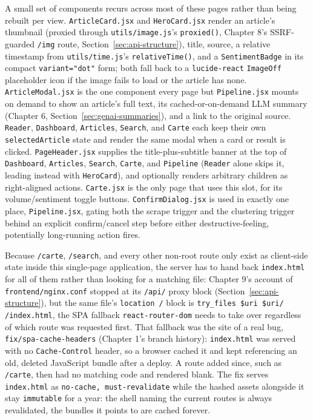 \begin{sloppypar}
A small set of components recurs across most of these pages rather than being rebuilt per view. \texttt{ArticleCard.jsx} and \texttt{HeroCard.jsx} render an article's thumbnail (proxied through \texttt{utils/\allowbreak image.js}'s \texttt{proxied()}, Chapter 8's SSRF-guarded \texttt{/img} route, Section~\ref{sec:api-structure}), title, source, a relative timestamp from \texttt{utils/\allowbreak time.js}'s \texttt{relativeTime()}, and a \texttt{SentimentBadge} in its compact \texttt{variant="dot"} form; both fall back to a \texttt{lucide-react} \texttt{ImageOff} placeholder icon if the image fails to load or the article has none. \texttt{ArticleModal.jsx} is the one component every page but \texttt{Pipeline.jsx} mounts on demand to show an article's full text, its cached-or-on-demand LLM summary (Chapter 6, Section~\ref{sec:genai-summaries}), and a link to the original source. \texttt{Reader}, \texttt{Dashboard}, \texttt{Articles}, \texttt{Search}, and \texttt{Carte} each keep their own \texttt{selectedArticle} state and render the same modal when a card or result is clicked. \texttt{PageHeader.jsx} supplies the title-plus-subtitle banner at the top of \texttt{Dashboard}, \texttt{Articles}, \texttt{Search}, \texttt{Carte}, and \texttt{Pipeline} (\texttt{Reader} alone skips it, leading instead with \texttt{HeroCard}), and optionally renders arbitrary children as right-aligned actions. \texttt{Carte.jsx} is the only page that uses this slot, for its volume/sentiment toggle buttons. \texttt{ConfirmDialog.jsx} is used in exactly one place, \texttt{Pipeline.jsx}, gating both the scrape trigger and the clustering trigger behind an explicit confirm/cancel step before either destructive-feeling, potentially long-running action fires.
\end{sloppypar}

\begin{sloppypar}
Because \texttt{/carte}, \texttt{/search}, and every other non-root route only exist as client-side state inside this single-page application, the server has to hand back \texttt{index.html} for all of them rather than looking for a matching file: Chapter 9's account of \texttt{frontend/\allowbreak nginx.conf} stopped at its \texttt{/api/} proxy block (Section~\ref{sec:api-structure}), but the same file's \texttt{location /} block is \texttt{try\_files \$uri \$uri/ /index.html}, the SPA fallback \texttt{react-router-dom} needs to take over regardless of which route was requested first. That fallback was the site of a real bug, \texttt{fix/\allowbreak spa-cache-headers} (Chapter 1's branch history): \texttt{index.html} was served with no \texttt{Cache-Control} header, so a browser cached it and kept referencing an old, deleted JavaScript bundle after a deploy. A route added since, such as \texttt{/carte}, then had no matching code and rendered blank. The fix serves \texttt{index.html} as \texttt{no-cache, must-revalidate} while the hashed assets alongside it stay \texttt{immutable} for a year: the shell naming the current routes is always revalidated, the bundles it points to are cached forever.
\end{sloppypar}

